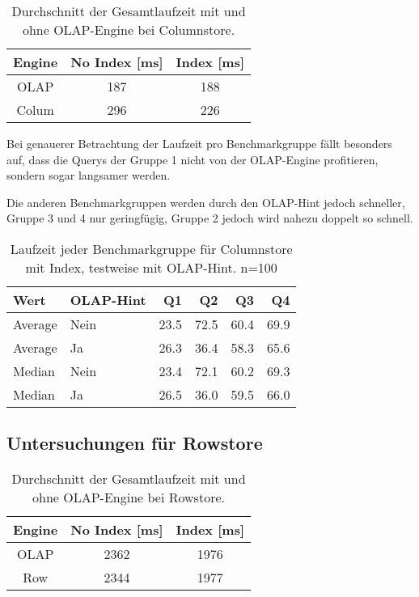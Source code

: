 \setlength\intextsep{0pt}
\begin{wraptable}{r}{0.5\textwidth}
    \begin{tabular}{ccc}
        \toprule
        Engine              & No Index [ms]   & Index [ms] \\
        \toprule
        OLAP                & 187        & 188            \\
        Colum               & 296        & 226            \\   
        \bottomrule
    \end{tabular}
	\caption{Durchschnitt der Gesamtlaufzeit mit und ohne OLAP-Engine bei Columnstore.}
    \label{tab:olap_col}
\end{wraptable}

Bei genauerer Betrachtung der Laufzeit pro Benchmarkgruppe fällt besonders auf, dass die Querys der Gruppe 1 nicht von der OLAP-Engine profitieren, sondern sogar langsamer werden. 

Die anderen Benchmarkgruppen werden durch den OLAP-Hint jedoch schneller, Gruppe 3 und 4 nur geringfügig, Gruppe 2 jedoch wird nahezu doppelt so schnell.
\begin{table}[H]
    \centering
    \begin{tabularx}{\textwidth}{lXrrrr}
    \toprule
	Wert        &	OLAP-Hint & Q1 	    &	Q2 	    &	Q3	    &	Q4 \\
    \toprule
    Average	    & Nein        &	23.5	&	72.5	&	60.4	&	69.9 \\
    Average     & Ja	      &	26.3	&	36.4	&	58.3	&	65.6 \\
    \midrule
    Median	    & Nein        &	23.4	&	72.1	&	60.2	&	69.3 \\
    Median	    & Ja          &	26.5	&	36.0	&	59.5	&	66.0 \\
    \bottomrule
    \end{tabularx}
	\caption{Laufzeit jeder Benchmarkgruppe für Columnstore mit Index, testweise mit OLAP-Hint. n=100}
    \label{tab:olap_bench}
\end{table}
\setlength\intextsep{0pt}
\subsection{Untersuchungen für Rowstore}
\begin{wraptable}{r}{0.5\textwidth}
    \begin{tabular}{ccc}
        \toprule
        Engine              & No Index [ms]   & Index [ms] \\
        \toprule
        OLAP                & 2362        & 1976           \\
        Row                 & 2344        & 1977           \\   
        \bottomrule
    \end{tabular}
	\caption{Durchschnitt der Gesamtlaufzeit mit und ohne OLAP-Engine bei Rowstore.}
    \label{tab:olap_row}
\end{wraptable}


